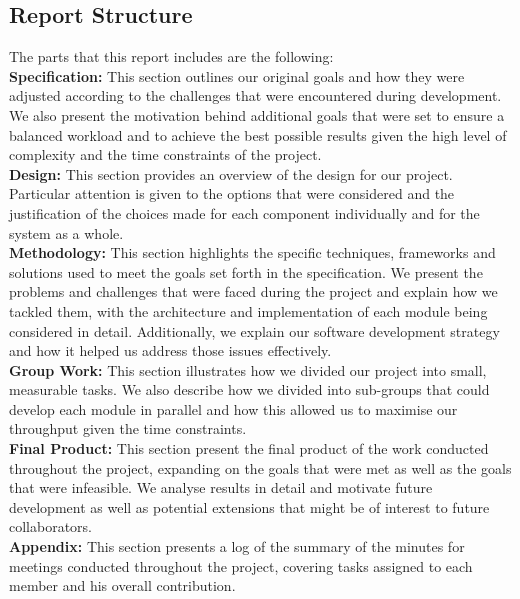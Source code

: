 \documentclass[a4paper,11pt]{article}
\begin{document}
\subsection{Report Structure}
The parts that this report includes are the following:\\

\noindent
\textbf{Specification:}
This section outlines our original goals and how they were adjusted according to the challenges that were encountered during development. We also present the motivation behind additional goals that were set to ensure a balanced workload and to achieve the best possible results given the high level of complexity and the time constraints of the project.\\

\noindent
\textbf{Design:} This section provides an overview of the design for our project. Particular attention is given to the options that were considered and the justification of the choices made for each component individually and for the system as a whole.\\

\noindent
\textbf{Methodology:} This section highlights the specific techniques, frameworks and solutions used to meet the goals set forth in the specification. We present the problems and challenges that were faced during the project and explain how we tackled them, with the architecture and implementation of each module being considered in detail. Additionally, we explain our software development strategy and how it helped us address those issues effectively.\\

\noindent
\textbf{Group Work:} This section illustrates how we divided our project into small, measurable tasks. We also describe how we divided into sub-groups that could develop each module in parallel and how this allowed us to maximise our throughput given the time constraints.\\

\noindent
\textbf{Final Product:} This section present the final product of the work conducted throughout the project, expanding on the goals that were met as well as the goals that were infeasible. We analyse results in detail and motivate future development as well as potential extensions that might be of interest to future collaborators.\\

\noindent
\textbf{Appendix:} This section presents a log of the summary of the minutes for meetings conducted throughout the project, covering tasks assigned to each member and his overall contribution. 
\end{document}
